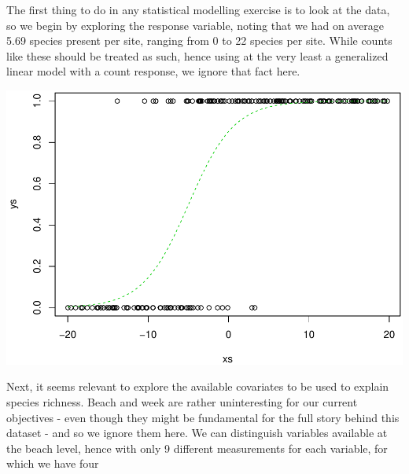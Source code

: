 \documentclass[
]{book}
\newenvironment{Shaded}{\begin{snugshade}}{\end{snugshade}}
\newcommand{\AttributeTok}[1]{\textcolor[rgb]{0.13,0.29,0.53}{#1}}
\newcommand{\DecValTok}[1]{\textcolor[rgb]{0.00,0.00,0.81}{#1}}
\newcommand{\FloatTok}[1]{\textcolor[rgb]{0.00,0.00,0.81}{#1}}
\newcommand{\FunctionTok}[1]{\textcolor[rgb]{0.13,0.29,0.53}{\textbf{#1}}}
\newcommand{\NormalTok}[1]{#1}
\newcommand{\SpecialCharTok}[1]{\textcolor[rgb]{0.81,0.36,0.00}{\textbf{#1}}}
\newcommand{\StringTok}[1]{\textcolor[rgb]{0.31,0.60,0.02}{#1}}
\begin{document}
The first thing to do in any statistical modelling exercise is to look at the data, so we begin by exploring the response variable, noting that we had on average 5.69 species present per site, ranging from 0 to 22 species per site. While counts like these should be treated as such, hence using at the very least a generalized linear model with a count response, we ignore that fact here.

\begin{Shaded}
\end{Shaded}

\includegraphics{ECOMODbook_files/figure-latex/unnamed-chunk-13-1.pdf}

Next, it seems relevant to explore the available covariates to be used to explain species richness. Beach and week are rather uninteresting for our current objectives - even though they might be fundamental for the full story behind this dataset - and so we ignore them here. We can distinguish variables available at the beach level, hence with only 9 different measurements for each variable, for which we have four

\begin{Shaded}
\end{Shaded}
\end{document}
